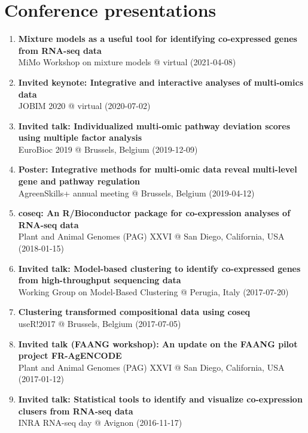 \documentclass[11pt, a4paper]{awesome-cv}
\providecommand{\tightlist}{%
	\setlength{\itemsep}{0pt}\setlength{\parskip}{0pt}}
\begin{document}
\hypertarget{conference-presentations}{%
\section{Conference presentations}\label{conference-presentations}}

\begin{enumerate}
\def\labelenumi{\arabic{enumi}.}
\tightlist
\item
  \textbf{Mixture models as a useful tool for identifying co-expressed
  genes from RNA-seq data}\\
  MiMo Workshop on mixture models @ virtual (2021-04-08)
\item
  \textbf{Invited keynote: Integrative and interactive analyses of
  multi-omics data}\\
  JOBIM 2020 @ virtual (2020-07-02)
\item
  \textbf{Invited talk: Individualized multi-omic pathway deviation
  scores using multiple factor analysis}\\
  EuroBioc 2019 @ Brussels, Belgium (2019-12-09)
\item
  \textbf{Poster: Integrative methods for multi-omic data reveal
  multi-level gene and pathway regulation}\\
  AgreenSkills+ annual meeting @ Brussels, Belgium (2019-04-12)
\item
  \textbf{coseq: An R/Bioconductor package for co-expression analyses of
  RNA-seq data}\\
  Plant and Animal Genomes (PAG) XXVI @ San Diego, California, USA
  (2018-01-15)
\item
  \textbf{Invited talk: Model-based clustering to identify co-expressed
  genes from high-throughput sequencing data}\\
  Working Group on Model-Based Clustering @ Perugia, Italy (2017-07-20)
\item
  \textbf{Clustering transformed compositional data using coseq}\\
  useR!2017 @ Brussels, Belgium (2017-07-05)
\item
  \textbf{Invited talk (FAANG workshop): An update on the FAANG pilot
  project FR-AgENCODE}\\
  Plant and Animal Genomes (PAG) XXVI @ San Diego, California, USA
  (2017-01-12)
\item
  \textbf{Invited talk: Statistical tools to identify and visualize
  co-expression clusers from RNA-seq data}\\
  INRA RNA-seq day @ Avignon (2016-11-17)

\end{enumerate}
\end{document}
